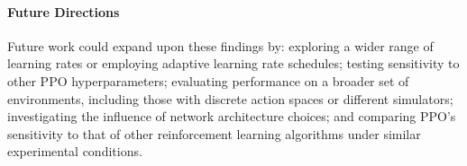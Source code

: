 \documentclass{article}
\begin{document}
\paragraph{Future Directions}
Future work could expand upon these findings by: exploring a wider range of learning rates or employing adaptive learning rate schedules; testing sensitivity to other PPO hyperparameters; evaluating performance on a broader set of environments, including those with discrete action spaces or different simulators; investigating the influence of network architecture choices; and comparing PPO's sensitivity to that of other reinforcement learning algorithms under similar experimental conditions.

\end{document}
